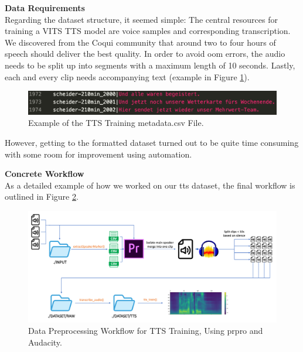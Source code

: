 \documentclass[
  a4paper,  %
  twoside,  %
  bibliography=totoc,
  headsepline,
  cleardoublepage=empty,
  parskip=half,
  draft=false
]{scrbook}
\begin{document}
\textbf{Data Requirements} \\
Regarding the dataset structure, it seemed simple: The central resources for training a VITS TTS model are voice samples and corresponding transcription. We discovered from the Coqui community that around two to four hours of speech should deliver the best quality. In order to avoid \gls{oom} errors, the audio needs to be split up into segments with a maximum length of 10 seconds. Lastly, each and every clip needs accompanying text (example in Figure \ref{fig:metadata.csv}).

\begin{figure}[h]
  \centering
  \includegraphics[width=1\textwidth]{./graphics/tts/csv.png}
  \caption{Example of the TTS Training metadata.csv File.}
  \label{fig:metadata.csv}
\end{figure}

However, getting to the formatted dataset turned out to be quite time consuming with some room for improvement using automation.

\textbf{Concrete Workflow} \\
As a detailed example of how we worked on our \gls{tts} dataset, the final workflow is outlined in Figure \ref{fig:dvt-tts-wf}.

\begin{figure}[h]
  \centering
  \includegraphics[width=1\textwidth]{./graphics/tts/tts prpro.png}
  \caption{Data Preprocessing Workflow for TTS Training, Using \gls{prpro} and Audacity.}
  \label{fig:dvt-tts-wf}
\end{figure}
\end{document}
